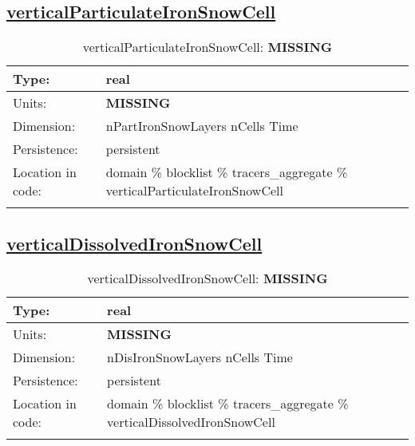 \subsection[verticalParticulateIronSnowCell]{\hyperref[sec:var_tab_tracers_aggregate]{verticalParticulateIronSnowCell}}
\label{subsec:var_sec_tracers_aggregate_verticalParticulateIronSnowCell}
\begin{center}
\begin{longtable}{| p{2.0in} | p{4.0in} |}
        \hline 
        Type: & real \\
        \hline 
        Units: & {\bf \color{red} MISSING} \\
        \hline 
        Dimension: & nPartIronSnowLayers nCells Time \\
        \hline 
        Persistence: & persistent \\
        \hline 
         Location in code: & domain \% blocklist \% tracers\_aggregate \% verticalParticulateIronSnowCell \\
         \hline 
    \caption{verticalParticulateIronSnowCell: {\bf \color{red} MISSING}}
\end{longtable}
\end{center}
\subsection[verticalDissolvedIronSnowCell]{\hyperref[sec:var_tab_tracers_aggregate]{verticalDissolvedIronSnowCell}}
\label{subsec:var_sec_tracers_aggregate_verticalDissolvedIronSnowCell}
\begin{center}
\begin{longtable}{| p{2.0in} | p{4.0in} |}
        \hline 
        Type: & real \\
        \hline 
        Units: & {\bf \color{red} MISSING} \\
        \hline 
        Dimension: & nDisIronSnowLayers nCells Time \\
        \hline 
        Persistence: & persistent \\
        \hline 
         Location in code: & domain \% blocklist \% tracers\_aggregate \% verticalDissolvedIronSnowCell \\
         \hline 
    \caption{verticalDissolvedIronSnowCell: {\bf \color{red} MISSING}}
\end{longtable}
\end{center}
